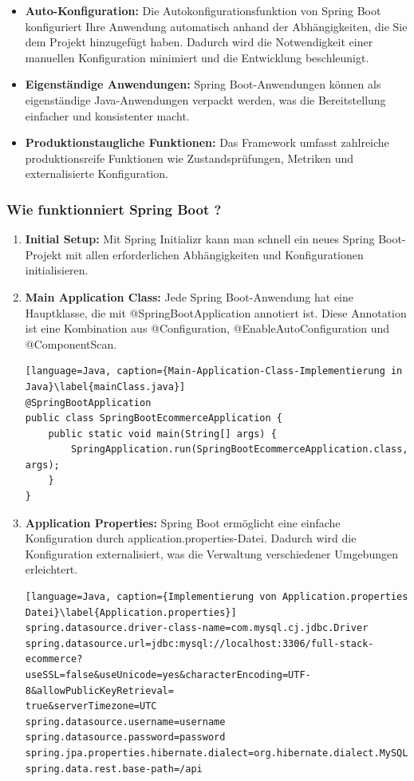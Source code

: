 \begin{itemize}
	\item \textbf{Auto-Konfiguration:} Die Autokonfigurationsfunktion von Spring Boot konfiguriert Ihre Anwendung automatisch anhand der Abhängigkeiten, die Sie dem Projekt hinzugefügt haben. Dadurch wird die Notwendigkeit einer manuellen Konfiguration minimiert und die Entwicklung beschleunigt.
	\item \textbf{Eigenständige Anwendungen:} Spring Boot-Anwendungen können als eigenständige Java-Anwendungen verpackt werden, was die Bereitstellung einfacher und konsistenter macht.
	\item \textbf{Produktionstaugliche Funktionen:} Das Framework umfasst zahlreiche produktionsreife Funktionen wie Zustandsprüfungen, Metriken und externalisierte Konfiguration.	
\end{itemize}

\subsubsection{Wie funktionniert Spring Boot ?}

\begin{enumerate}
	\item \textbf{Initial Setup:} Mit Spring Initializr kann man schnell ein neues Spring Boot-Projekt mit allen erforderlichen Abhängigkeiten und Konfigurationen initialisieren.
	\item \textbf{Main Application Class:} Jede Spring Boot-Anwendung hat eine Hauptklasse, die mit @SpringBootApplication annotiert ist. Diese Annotation ist eine Kombination aus @Configuration, @EnableAutoConfiguration und @ComponentScan.
	\begin{lstlisting}[language=Java, caption={Main-Application-Class-Implementierung in Java}\label{mainClass.java}]
@SpringBootApplication
public class SpringBootEcommerceApplication {	
	public static void main(String[] args) {
		SpringApplication.run(SpringBootEcommerceApplication.class, args);
	}
}		
	\end{lstlisting}
	\item \textbf{Application Properties:} Spring Boot ermöglicht eine einfache Konfiguration durch application.properties-Datei. Dadurch wird die Konfiguration externalisiert, was die Verwaltung verschiedener Umgebungen erleichtert.
	\begin{lstlisting}[language=Java, caption={Implementierung von Application.properties Datei}\label{Application.properties}]
spring.datasource.driver-class-name=com.mysql.cj.jdbc.Driver
spring.datasource.url=jdbc:mysql://localhost:3306/full-stack-ecommerce?
useSSL=false&useUnicode=yes&characterEncoding=UTF-8&allowPublicKeyRetrieval=
true&serverTimezone=UTC
spring.datasource.username=username
spring.datasource.password=password
spring.jpa.properties.hibernate.dialect=org.hibernate.dialect.MySQL8Dialect
spring.data.rest.base-path=/api
	\end{lstlisting}
\end{enumerate}

